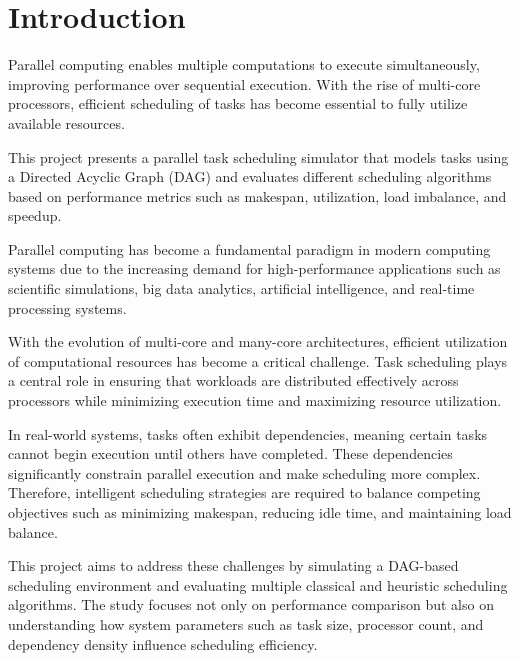 \documentclass[12pt,a4paper]{article}
\begin{document}
	
	\renewcommand*\contentsname{Table of Contents}
	\tableofcontents
	\newpage
	\newpage
    \newpage
   
    \section{Introduction}
        Parallel computing enables multiple computations to execute simultaneously, improving performance over sequential execution. With the rise of multi-core processors, efficient scheduling of tasks has become essential to fully utilize available resources.

This project presents a parallel task scheduling simulator that models tasks using a Directed Acyclic Graph (DAG) and evaluates different scheduling algorithms based on performance metrics such as makespan, utilization, load imbalance, and speedup.

Parallel computing has become a fundamental paradigm in modern computing systems due to the increasing demand for high-performance applications such as scientific simulations, big data analytics, artificial intelligence, and real-time processing systems.

With the evolution of multi-core and many-core architectures, efficient utilization of computational resources has become a critical challenge. Task scheduling plays a central role in ensuring that workloads are distributed effectively across processors while minimizing execution time and maximizing resource utilization.

In real-world systems, tasks often exhibit dependencies, meaning certain tasks cannot begin execution until others have completed. These dependencies significantly constrain parallel execution and make scheduling more complex. Therefore, intelligent scheduling strategies are required to balance competing objectives such as minimizing makespan, reducing idle time, and maintaining load balance.

This project aims to address these challenges by simulating a DAG-based scheduling environment and evaluating multiple classical and heuristic scheduling algorithms. The study focuses not only on performance comparison but also on understanding how system parameters such as task size, processor count, and dependency density influence scheduling efficiency.
\end{document}
